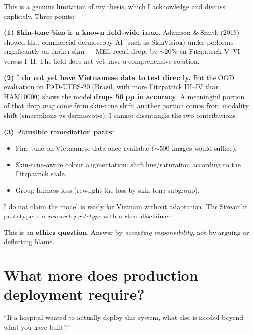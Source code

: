 \documentclass[11pt,a4paper]{article}
\begin{document}
\begin{answer}
This is a genuine limitation of my thesis, which I acknowledge and discuss explicitly. Three points:

\textbf{(1) Skin-tone bias is a known field-wide issue.} Adamson \& Smith (2018) showed that commercial dermoscopy AI (such as SkinVision) under-performs significantly on darker skin --- MEL recall drops by $\sim$20\% on Fitzpatrick V--VI versus I--II. The field does not yet have a comprehensive solution.

\textbf{(2) I do not yet have Vietnamese data to test directly.} But the OOD evaluation on PAD-UFES-20 (Brazil, with more Fitzpatrick III--IV than HAM10000) shows the model \textbf{drops 56 pp in accuracy}. A meaningful portion of that drop \textit{may} come from skin-tone shift; another portion comes from modality shift (smartphone vs dermoscope). I cannot disentangle the two contributions.

\textbf{(3) Plausible remediation paths:}
\begin{itemize}[leftmargin=*]
  \item Fine-tune on Vietnamese data once available ($\sim$500 images would suffice).
  \item Skin-tone-aware colour augmentation: shift hue/saturation according to the Fitzpatrick scale.
  \item Group fairness loss (reweight the loss by skin-tone subgroup).
\end{itemize}

I do not claim the model is ready for Vietnam without adaptation. The Streamlit prototype is a \textit{research prototype} with a clear disclaimer.
\end{answer}

\begin{tip}
This is an \textbf{ethics question}. Answer by \textit{accepting responsibility}, not by arguing or deflecting blame.
\end{tip}

\section{What more does production deployment require?}

\begin{question}
``If a hospital wanted to actually deploy this system, what else is needed beyond what you have built?''
\end{question}
\end{document}
